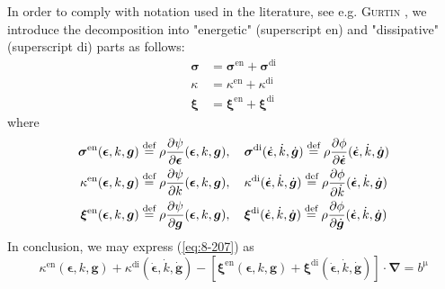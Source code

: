 In order to comply with notation used in the literature, see e.g. {\scshape Gurtin} \cite{Gurtin2000}, we introduce the decomposition into "energetic" (superscript en) and "dissipative" (superscript di) parts as follows:
\begin{subequations}\label{eq:8-409}
    \begin{align}
    \bm{\sigma} &= \bm{\sigma}^{\mathrm{en}} + \bm{\sigma}^{\mathrm{di}}
\label{eq:8-409a}\\
    \kappa &= \kappa^{\mathrm{en}} + \kappa^{\mathrm{di}}
\label{eq:8-409b}\\
    \bm{\xi} &= \bm{\xi}^{\mathrm{en}} + \bm{\xi}^{\mathrm{di}}
\label{eq:8-409c}
    \end{align}
\end{subequations}
where
\begin{subequations}\label{eq:8-209}
    \begin{align}
    \bm{\sigma}^{\mathrm{en}}(\bm{\epsilon},k,\bm{g}) &\stackrel{\text{def}}{=} \rho\frac{\partial \psi}{\partial \bm{\epsilon}}(\bm{\epsilon},k,\bm{g}), \quad
    \bm{\sigma}^{\mathrm{di}}(\dot{\bm{\epsilon}},\dot{k},\dot{\bm{g}}) \stackrel{\text{def}}{=} \rho\frac{\partial \phi}{\partial \dot{\bm{\epsilon}}}(\dot{\bm{\epsilon}},\dot{k},\dot{\bm{g}})
\label{eq:8-209a}\\
    \kappa^{\mathrm{en}}(\bm{\epsilon},k,\bm{g}) &\stackrel{\text{def}}{=} \rho\frac{\partial \psi}{\partial k}(\bm{\epsilon},k,\bm{g}), \quad
    \kappa^{\mathrm{di}}(\dot{\bm{\epsilon}},\dot{k},\dot{\bm{g}}) \stackrel{\text{def}}{=} \rho\frac{\partial \phi}{\partial \dot{k}}(\dot{\bm{\epsilon}},\dot{k},\dot{\bm{g}})
\label{eq:8-209b}\\
    \bm{\xi}^{\mathrm{en}}(\bm{\epsilon},k,\bm{g}) &\stackrel{\text{def}}{=} \rho\frac{\partial \psi}{\partial \bm{g}}(\bm{\epsilon},k,\bm{g}), \quad
    \bm{\xi}^{\mathrm{di}}(\dot{\bm{\epsilon}},\dot{k},\dot{\bm{g}}) \stackrel{\text{def}}{=} \rho\frac{\partial \phi}{\partial \dot{\bm{g}}}(\dot{\bm{\epsilon}},\dot{k},\dot{\bm{g}})
\label{eq:8-209c}
    \end{align}
\end{subequations}
In conclusion, we may express (\ref{eq:8-207}) as
\begin{equation}
    \kappa^{\mathrm{en}}(\bm{\epsilon},k,\bm{g}) + \kappa^{\mathrm{di}}(\dot{\bm{\epsilon}},\dot{k},\dot{\bm{g}}) -
    \left[\bm{\xi}^{\mathrm{en}}(\bm{\epsilon},k,\bm{g}) + \bm{\xi}^{\mathrm{di}}(\dot{\bm{\epsilon}},\dot{k},\dot{\bm{g}})\right]\cdot\bm{\nabla}
    = b^{\mathrm{\mu}}
\label{eq:8-404} 
\end{equation}

